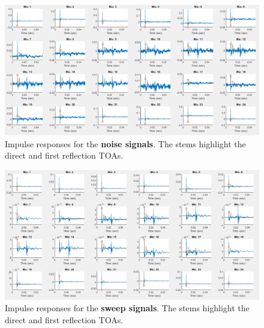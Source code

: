 \documentclass[a4paper]{article}
\begin{document}
\begin{figure}[h]
	\centering
	\includegraphics[width=0.85\linewidth]{noise_ir.png}
	\caption{Impulse responses for the \textbf{noise signals}. The stems highlight the direct and first reflection TOAs.}
	\label{fig:noiseir}
\end{figure}

\begin{figure}[h]
	\centering
	\includegraphics[width=0.85\linewidth]{sweep_ir.png}
	\caption{Impulse responses for the \textbf{sweep signals}. The stems highlight the direct and first reflection TOAs.}
	\label{fig:sweepir}
\end{figure}
\end{document}
